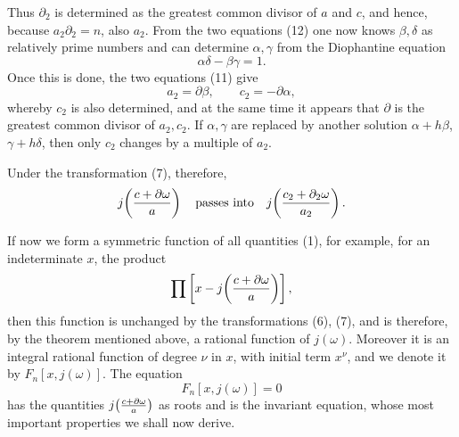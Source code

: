 \documentclass[11pt]{article}
\begin{document}
Thus $\partial_2$ is determined as the greatest common divisor of $a$ and $c$, and hence, because $a_2\partial_2=n$, also $a_2$. From the two equations (12) one now knows $\beta,\delta$ as relatively prime numbers and can determine $\alpha,\gamma$ from the Diophantine equation
\[
\alpha\delta-\beta\gamma=1.
\]
Once this is done, the two equations (11) give
\begin{equation}
a_2=\partial\beta,
\qquad
c_2=-\partial\alpha,
\tag{13}
\end{equation}
whereby $c_2$ is also determined, and at the same time it appears that $\partial$ is the greatest common divisor of $a_2,c_2$. If $\alpha,\gamma$ are replaced by another solution $\alpha+h\beta$, $\gamma+h\delta$, then only $c_2$ changes by a multiple of $a_2$.

Under the transformation (7), therefore,
\[
j\!\left({c+\partial\omega\over a}\right)
\quad\hbox{passes into}\quad
j\!\left({c_2+\partial_2\omega\over a_2}\right).
\]

If now we form a symmetric function of all quantities (1), for example, for an indeterminate $x$, the product
\[
\prod\left[x-j\!\left({c+\partial\omega\over a}\right)\right],
\]
then this function is unchanged by the transformations (6), (7), and is therefore, by the theorem mentioned above, a rational function of $j(\omega)$. Moreover it is an integral rational function of degree $\nu$ in $x$, with initial term $x^\nu$, and we denote it by $F_n[x,j(\omega)]$. The equation
\begin{equation}
F_n[x,j(\omega)]=0
\tag{14}
\end{equation}
has the quantities $j\!\left({c+\partial\omega\over a}\right)$ as roots and is the invariant equation, whose most important properties we shall now derive.
\end{document}
